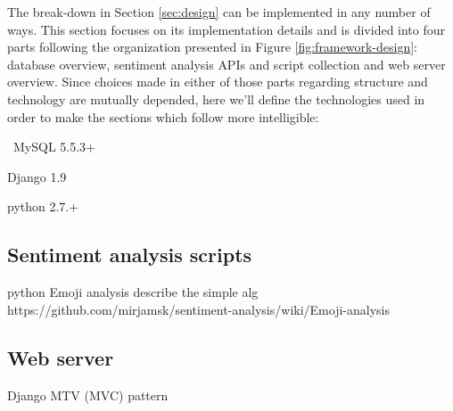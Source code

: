 \newcommand*{\ImplementationPath}{04-framework/02-implementation}

The break-down in Section \ref{sec:design} can be implemented in any number of ways. 
This section focuses on its implementation details and is divided into four parts following the organization presented in Figure \ref{fig:framework-design}: database overview, sentiment analysis APIs and script collection and web server overview. 
Since choices made in either of those parts regarding structure and technology are mutually depended, here we'll define the technologies used in order to make the sections which follow more intelligible:
\begin{description}
\singlespacing
 \item[DBMS:] MySQL 5.5.3+
 \item[Web framework:] Django 1.9 
 \item[Sentiment analysis scripts:] python 2.7.+
\end{description}





\subsection{Sentiment analysis scripts\label{sec:scripts}}
python
Emoji analysis
describe the simple alg 
https://github.com/mirjamsk/sentiment-analysis/wiki/Emoji-analysis

\subsection{Web server\label{sec:web-server}}
Django
MTV (MVC) pattern
